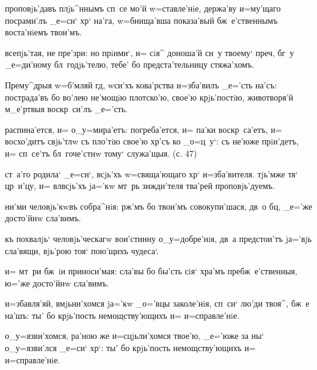 проповjь'давъ плjь^ннымъ сп~се мо'й w=ставле'нiе, 
держа'ву и=му'щаго посрами'лъ _е=си` хр` на'га, 
w=бнища'вша показа'вый бж~е'ственнымъ воста'нiемъ 
твои'мъ.

всепjь'тая, не пре'зри: но прiими`, и= сiя^ доноша'й сн~у 
твоему` преч, бг~у _е=ди'ному бл~годjь'телю, тебе' 
бо предста'тельницу стяжа'хомъ.


Прему^дрыя w=б'мляй гд, w\т си'хъ кова'рства 
и=зба'вилъ _е='сть на'съ: пострада'въ бо во'лею не'мощiю 
плотско'ю, свое'ю крjь'постiю, животворя'й м_е'ртвыя 
воскр~си'лъ _е='сть.

распина'ется, и= о_у=мира'етъ: погреба'ется, и= па'ки 
воскр~са'етъ, и= восхо'дитъ свjь'тлw съ пло'тiю свое'ю 
хр'съ ко _о=ц~у`: съ не'юже прiи'детъ, и= сп~се'тъ 
бл~гоче'стнw тому` служа'щыя. (с. 47)

ст~а'го родила` _е=си`, всjь'хъ w=свяща'ющаго хр` 
и=зба'вителя. тjь'мже тя` цр~и'цу, и= вл всjь'хъ 
jа='кw мт~рь зижди'теля тва'рей проповjь'дуемъ.


ни'ми человjь'кwвъ собра^нiя: рж'мъ бо твои'мъ 
совокупи'шася, дв~о бц, _е='же досто'йнw сла'вимъ.

къ похвалjь` человjь'ческагw вои'стинну о_у=добре'нiя, 
дв~а предстои'тъ jа='вjь сла'вящи, вjь'рою тоя` пою'щихъ 
чудеса`.

и= мт~ри бж~iи приноси'мая: сла'вы бо бы'сть сiя` хра'мъ 
пребж~е'ственныя, ю='же досто'йнw сла'вимъ.


и=збавля'яй, вмjьни'хомся jа='кw _о='вцы заколе'нiя, 
сп~си` лю'ди твоя^, бж~е на'шъ: ты' бо крjь'пость 
немощству'ющихъ и= и=справле'нiе.

о_у=язви'хомся, ра'ною же и=сцjьли'хомся твое'ю, _е='юже 
за ны` о_у=язви'лся _е=си` хр`: ты' бо крjь'пость 
немощству'ющихъ и= и=справле'нiе.


